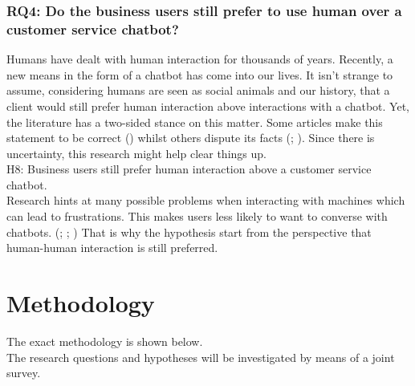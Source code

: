 \subsubsection{RQ4: Do the business users still prefer to use human over a customer service chatbot?}
Humans have dealt with human interaction for thousands of years. Recently, a new means in the form of a chatbot has come into our lives. It isn’t strange to assume, considering humans are seen as social animals and our history, that a client would still prefer human interaction above interactions with a chatbot. Yet, the literature has a two-sided stance on this matter. Some articles make this statement to be correct (\cite{Ashfaq2020}) whilst others dispute its facts (\cite{Muizzah2021}; \cite{Radziwil2021}). Since there is uncertainty, this research might help clear things up.\\
\break
H8: Business users still prefer human interaction above a customer service chatbot.\\
\break
Research hints at many possible problems when interacting with machines which can lead to frustrations. This makes users less likely to want to converse with chatbots. (\cite{Ashfaq2020}; \cite{brandtzaeg2020}; \cite{Goot2020}) That is why the hypothesis start from the perspective that human-human interaction is still preferred.

\section{Methodology}
The exact methodology is shown below.\\
\break
The research questions and hypotheses will be investigated by means of a joint survey.\\
